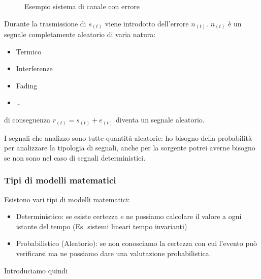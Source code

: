         \begin{figure}[H]
            \centering
            \label{fig:Sistema di comunicazione canale con errore}
            \caption{Esempio sistema di canale con errore}
        \end{figure}
        Durante la trasmissione di $s_{(t)}$ viene introdotto dell'errore $n_{(t)}$. $n_{(t)}$ è un segnale completamente aleatorio di varia 
        natura:
        \begin{itemize}
            \item {Termico}
            \item {Interferenze}
            \item {Fading}
            \item {\dots}
        \end{itemize}
        \noindent di conseguenza $r_{(t)} = s_{(t)}+e_{(t)}$ diventa un segnale aleatorio.

        I segnali che analizzo sono tutte quantità aleatorie: ho bisogno della probabilità per analizzare la tipologia di segnali, anche per la sorgente
        potrei averne bisogno se non sono nel caso di segnali deterministici.

        \subsubsection{Tipi di modelli matematici}
            Esistono vari tipi di modelli matematici:
            \begin{itemize}
                \item {Deterministico: se esiste certezza e ne possiamo calcolare il valore a ogni istante del tempo (Es. sistemi lineari tempo invarianti)}
                \item {Probabilistico (Aleatorio): se non conosciamo la certezza con cui l'evento può verificarsi ma ne possiamo dare una valutazione probabilistica.}
            \end{itemize}
            Introduciamo quindi

